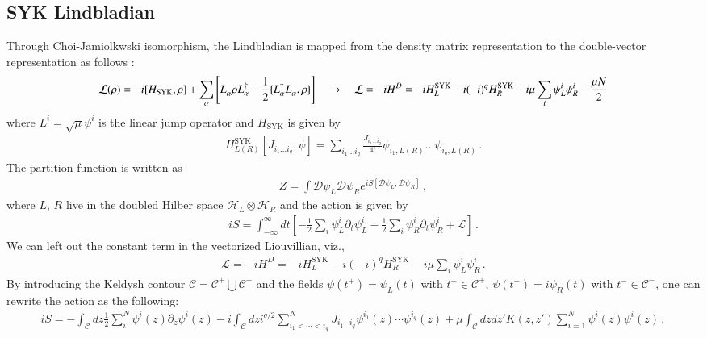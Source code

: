 \subsection{SYK Lindbladian}
Through Choi-Jamiolkwski isomorphism, the Lindbladian is mapped from the density matrix representation to the double-vector representation as follows \cite{sa2022lindbladian,kulkarni2022lindbladian}:
\begin{align}
  \mathcal{L}
  (\rho) = - i [H_{{\rm SYK}}, \rho]  +  \sum_{\alpha} \left[L^{\ }_{\alpha}\rho L^{\dag}_{\alpha}- \frac{1}{2} \{ L^{\dag}_{\alpha}L^{\ }_{\alpha}, \rho \} \right] \quad \rightarrow \quad \mathcal{L}=-i H^D= -i H_L^{\mathrm{SYK}}-i (-i)^q H_R^{\mathrm{SYK}}-i\mu \sum_i \psi_L^i \psi_R^i -\frac{\mu N}{2}
\end{align}
where $L^i=\sqrt{\mu} \psi^i$ is the linear jump operator and $H_{\text{SYK}}$ is given by
\begin{align}
H^{\text{SYK}}_{L(R)}[J_{i_1...i_q},\psi]=\sum_{i_1...i_q}\frac{J_{i_1...i_q}}{4!}\psi_{i_1,L(R)}...\psi_{i_q,L(R)}\,.
\end{align}
The partition function is written as 
\begin{align}
    Z=\int \mathcal{D}\psi_L \mathcal{D}\psi_R e^{iS[\mathcal{D}\psi_L,\mathcal{D}\psi_R]}\,,
\end{align}
where $L,\,R$ live in the doubled Hilber space $\mathcal{H}_L\otimes\mathcal{H}_R$ and the action is given by
\begin{gather}
    iS=\int_{-\infty}^{\infty} dt \left[-\frac{1}{2}\sum_i \psi^i_L \partial_t \psi_L^i-\frac{1}{2}\sum_i \psi^i_R \partial_t \psi_R^i +\mathcal{L} \right]\,.
    \label{eq:lindbladlagrangian}
\end{gather}
We can left out the constant term in the vectorized Liouvillian, viz.,
\begin{align}
     \mathcal{L}=-i H^D= -i H_L^{\mathrm{SYK}}-i (-i)^q H_R^{\mathrm{SYK}}-i\mu \sum_i \psi_L^i \psi_R^i \,.
\end{align}
By introducing the Keldysh contour $\mathcal{C}=\mathcal{C}^+\bigcup \mathcal{C}^-$ and the fields $\psi(t^+)=\psi_L(t)$ with $t^+\in \mathcal{C}^+$, $\psi(t^-)=i\psi_R(t)$ with $t^-\in \mathcal{C}^-$, one can rewrite the action as the following:
\begin{align}
      iS=-\int_{\mathcal{C}} dz \frac{1}{2}\sum_i^N \psi^i(z) \partial_z \psi^i(z)-i \int_{\mathcal{C}} dz i^{q/2}\sum_{i_1<\cdots<i_q}^N J_{i_1\cdots i_q}\psi^{i_1}(z)\cdots \psi^{i_q}(z)+\mu\int_{\mathcal{C}}dz dz' K(z,z')\sum_{i=1}^N \psi^i(z)\psi^i(z) \,,
\end{align}
